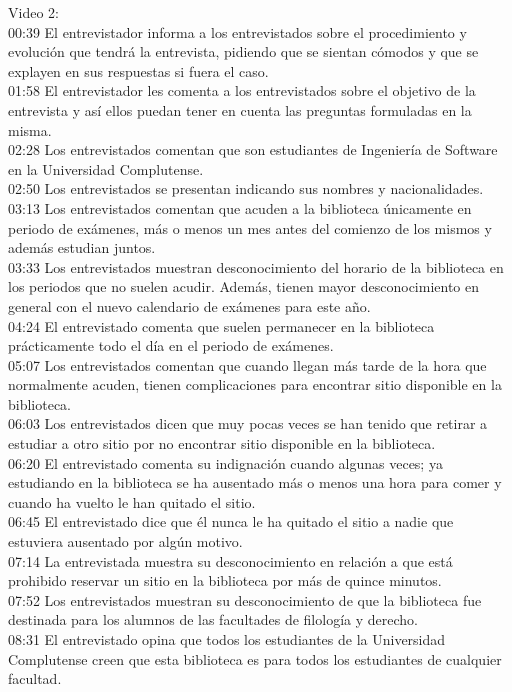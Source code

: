 \documentclass[12pt]{article}
\begin{document}
Video 2:\\ 
00:39 El entrevistador informa a los entrevistados sobre el procedimiento y evolución que tendrá la entrevista, pidiendo que se sientan cómodos y que se explayen en sus respuestas si fuera el caso.\\
01:58 El entrevistador les comenta a los entrevistados sobre el objetivo de la entrevista y así ellos puedan tener en cuenta las preguntas formuladas en la misma.\\
02:28 Los entrevistados comentan que son estudiantes de Ingeniería de Software en la Universidad Complutense.\\
02:50 Los entrevistados se presentan indicando sus nombres y nacionalidades.\\
03:13 Los entrevistados comentan que acuden a la biblioteca únicamente en periodo de exámenes, más o menos un mes antes del comienzo de los mismos y además estudian juntos.\\
03:33 Los entrevistados muestran desconocimiento del horario de la biblioteca en los periodos que no suelen acudir. Además, tienen mayor desconocimiento en general con el nuevo calendario de exámenes para este año.\\
04:24 El entrevistado comenta que suelen permanecer en la biblioteca prácticamente todo el día en el periodo de exámenes.\\
05:07 Los entrevistados comentan que cuando llegan más tarde de la hora que normalmente acuden, tienen complicaciones para encontrar sitio disponible en la biblioteca.\\
06:03 Los entrevistados dicen que muy pocas veces se han tenido que retirar a estudiar a otro sitio por no encontrar sitio disponible en la biblioteca.\\
06:20 El entrevistado comenta su indignación cuando algunas veces; ya estudiando en la biblioteca se ha ausentado más o menos una hora para comer y cuando ha vuelto le han quitado el sitio.\\
06:45 El entrevistado dice que él nunca le ha quitado el sitio a nadie que estuviera ausentado por algún motivo.\\
07:14 La entrevistada muestra su desconocimiento en relación a que está prohibido reservar un sitio en la biblioteca por más de quince minutos.\\
07:52 Los entrevistados muestran su desconocimiento de que la biblioteca fue destinada para los alumnos de las facultades de filología y derecho.\\
08:31 El entrevistado opina que todos los estudiantes de la Universidad Complutense creen que esta biblioteca es para todos los estudiantes de cualquier facultad. \\
\end{document}

